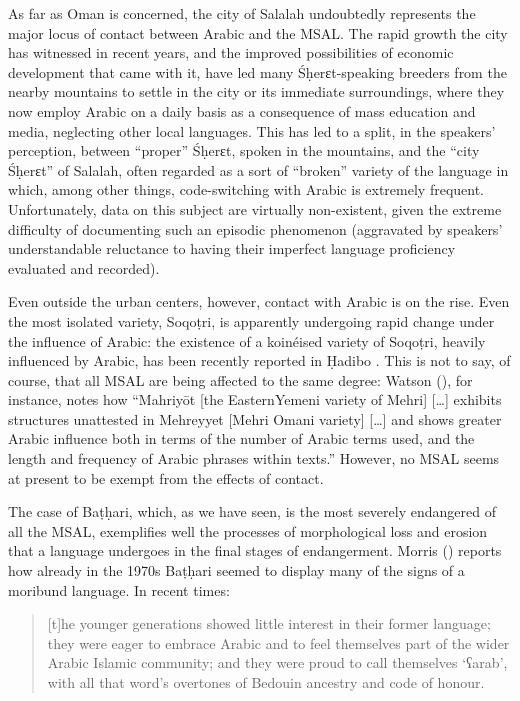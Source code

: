 \documentclass[output=paper]{langsci/langscibook}
\begin{document}
As far as Oman is concerned, the city of Salalah undoubtedly represents the major locus of contact between Arabic and the MSAL. The rapid growth the city has witnessed in recent years, and the improved possibilities of economic development that came with it, have led many Śḥerɛt-speaking breeders from the nearby mountains to settle in the city or its immediate surroundings, where they now employ Arabic on a daily basis as a consequence of mass education and media, neglecting other local languages. This has led to a split, in the speakers’ perception, between ``proper'' Śḥerɛt, spoken in the mountains, and the ``city Śḥerɛt'' of Salalah, often regarded as a sort of ``broken'' variety of the language in which, among other things, code-switching with Arabic is extremely frequent. Unfortunately, data on this subject are virtually non-existent, given the extreme difficulty of documenting such an episodic phenomenon (aggravated by speakers’ understandable reluctance to having their imperfect language proficiency evaluated and recorded). 

Even outside the urban centers, however, contact with Arabic is on the rise. Even the most isolated variety, Soqoṭri, is apparently undergoing rapid change under the influence of Arabic: the existence of a koinéised variety of Soqoṭri, heavily influenced by Arabic, has been recently reported in Ḥadibo \citep[27]{Morris2017}. This is not to say, of course, that all MSAL are being affected to the same degree: Watson (\citeyear[3]{Watson2012}), for instance, notes how “Mahriyōt [the EasternYemeni variety of Mehri] […] exhibits structures unattested in Mehreyyet [Mehri Omani variety] […] and shows greater Arabic influence both in terms of the number of Arabic terms used, and the length and frequency of Arabic phrases within texts.” However, no MSAL seems at present to be exempt from the effects of contact.

The case of Baṭḥari, which, as we have seen, is the most severely endangered of all the MSAL, exemplifies well the processes of morphological loss and erosion that a language undergoes in the final stages of endangerment. Morris (\citeyear{Morris2017}) reports how already in the 1970s Baṭḥari seemed to display many of the signs of a moribund language. In recent times:

\begin{quote}
[t]he younger generations showed little interest in their former language; they were eager to embrace Arabic and to feel themselves part of the wider Arabic Islamic community; and they were proud to call themselves ‘ʕarab’, with all that word’s overtones of Bedouin ancestry and code of honour. \citep[11]{Morris2017}
\end{quote}
\end{document}
